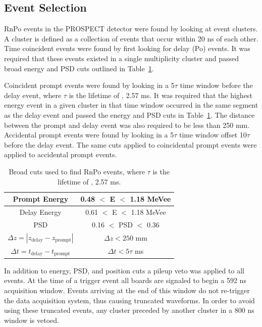 \subsection{Event Selection}

RnPo events in the PROSPECT detector were found by looking at event clusters.
A cluster is defined as a collection of events that occur within 20 ns of each other.
Time coincident events were found by first looking for delay (Po) events. 
It was required that these events existed in a single multiplicity cluster and passed broad energy and PSD cuts outlined in Table~\ref{tab:RnPoCuts}.

Coincident prompt events were found by looking in a 5$\tau$ time window before the delay event, where $\tau$ is the lifetime of \Po, 2.57 ms.
It was required that the highest energy event in a given cluster in that time window occurred in the same segment as the delay event and passed the energy and PSD cuts in Table~\ref{tab:RnPoCuts}.
The distance between the prompt and delay event was also required to be less than 250 mm. 
Accidental prompt events were found by looking in a 5$\tau$ time window offset 10$\tau$ before the delay event. 
The same cuts applied to coincidental prompt events were applied to accidental prompt events.

\begin{table}[!t]
	\centering
\begin{tabular}{c|c}
	\hline 
	Prompt Energy & 0.48 $<$ E $<$ 1.18 MeVee \\ 
	\hline 
	Delay Energy & 0.61 $<$ E $<$ 1.18 MeVee \\ 
	\hline 
	PSD & 0.16 $<$ PSD $<$ 0.36 \\ 
	\hline 
	$\Delta z = |z_{\textrm{delay}} - z_{\textrm{prompt}}|$ & $\Delta z < 250$ mm  \\ 
	\hline 
	$\Delta t = t_{\textrm{delay}} - t_{\textrm{prompt}}$ & $\Delta t < 5\tau$ ms \\ 
	\hline 
\end{tabular} 
\caption{Broad cuts used to find RnPo events, where $\tau$ is the lifetime of \Po, 2.57 ms.}
\label{tab:RnPoCuts}
\end{table}

In addition to energy, PSD, and position cuts a pileup veto was applied to all events.
At the time of a trigger event all boards are signaled to begin a 592 ns acquisition window. 
Events arriving at the end of this window do not re-trigger the data acquisition system, thus causing truncated waveforms.
In order to avoid using these truncated events, any cluster preceded by another cluster in a 800 ns window is vetoed. 

